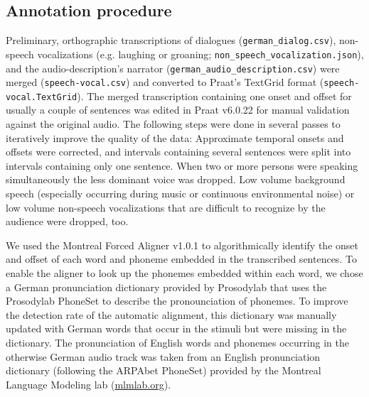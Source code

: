 \documentclass[10pt,a4paper,onecolumn]{article}
\begin{document}
\subsection*{Annotation procedure}
Preliminary, orthographic transcriptions of dialogues (\texttt{german\_dialog.csv}), non-speech vocalizations (e.g. laughing or groaning; \texttt{non\_speech\_vocalization.json}), and the audio-description's narrator
(\texttt{german\_audio\_description.csv}) were merged (\texttt{speech-vocal.csv}) and converted to Praat's \citep{boersma2019praat} TextGrid format  (\texttt{speech-vocal.TextGrid}).
The merged transcription containing one onset and offset for usually a couple of sentences was edited in Praat v6.0.22 for manual validation against the original audio.
The following steps were done in several passes to iteratively improve the quality of the data:
Approximate temporal onsets and offsets were corrected, and intervals containing several sentences were split into intervals containing only one sentence.
When two or more persons were speaking simultaneously the less dominant voice was dropped.
Low volume background speech (especially occurring during music or continuous environmental noise) or low volume non-speech vocalizations that are difficult to recognize by the audience were dropped, too.

We used the Montreal Forced Aligner v1.0.1 \citep{mcauliffe2017montreal} to
algorithmically identify the onset and offset of each word and phoneme embedded
in the transcribed sentences.
To enable the aligner to look up the phonemes embedded within each word, we chose a German pronunciation dictionary provided by Prosodylab \citep {gorman2011prosodylab} that uses the Prosodylab PhoneSet to describe the pronounciation of phonemes.
To improve the detection rate of the automatic alignment, this dictionary was manually updated with German words that occur in the stimuli but were missing in the dictionary.
The pronunciation of English words and phonemes occurring in the otherwise German audio track was taken from an English pronunciation dictionary (following the ARPAbet PhoneSet) provided by the Montreal Language Modeling lab (\href{http://mlmlab.org/mfa/dictionaries/english.dict}{mlmlab.org}).
\end{document}
